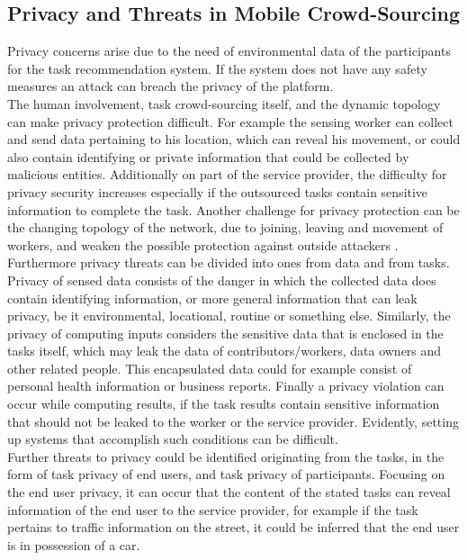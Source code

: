\documentclass[a4paper,12pt]{report}
\begin{document}
		\subsection{Privacy and Threats in Mobile Crowd-Sourcing} \label{PrivacyMCS}
		\startsubsection
			Privacy concerns arise due to the need of environmental data of the participants for the task recommendation system. 
			If the system does not have any safety measures an attack can breach the privacy of the platform. \\
			The human involvement, task crowd-sourcing itself, and the dynamic topology can make privacy protection difficult.
			For example the sensing worker can collect and send data pertaining to his location, which can reveal his movement, or could also contain identifying or private information that could be collected by malicious entities. 
			Additionally on part of the service provider, the difficulty for privacy security increases especially if the outsourced tasks contain sensitive information to complete the task. 
			Another challenge for privacy protection can be the changing topology of the network, due to joining, leaving and movement of workers, and weaken the possible protection against outside attackers \cite{SecPriMobCSM}.\\
			Furthermore privacy threats can be divided into ones from data and from tasks. 
			Privacy of sensed data consists of the danger in which the collected data does contain identifying information, or more general information that can leak privacy, be it environmental, locational, routine or something else. 
			Similarly, the privacy of computing inputs considers the sensitive data that is enclosed in the tasks itself, which may leak the data of contributors/workers, data owners and other related people. 
			This encapsulated data could for example consist of personal health information or business reports. 
			Finally a privacy violation can occur while computing results, if the task results contain sensitive information that should not be leaked to the worker or the service provider. 
			Evidently, setting up systems that accomplish such conditions can be difficult.\\
			Further threats to privacy could be identified originating from the tasks, in the form of task privacy of end users, and task privacy of participants. 
			Focusing on the end user privacy, it can occur that the content of the stated tasks can reveal information of the end user to the service provider, for example if the task pertains to traffic information on the street, it could be inferred that the end user is in possession of a car. 
\end{document}
